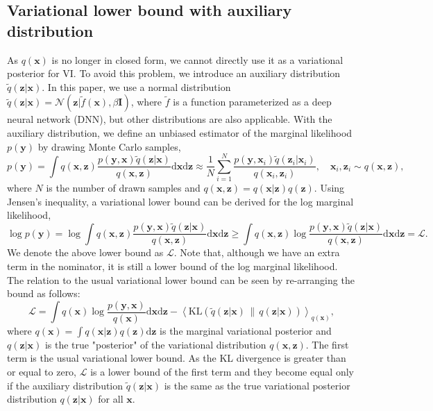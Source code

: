 \documentclass{article}
\newcommand{\yV}{\mathbf{y}}
\newcommand{\xV}{\mathbf{x}}
\newcommand{\zV}{\mathbf{z}}
\newcommand{\bound}{\mathcal{L}}
\newcommand{\I}{\mathbf{I}}
\newcommand{\KL}[2]{\text{KL}\left( #1\,\|\,#2 \right)}
\newcommand{\expectationDist}[2]{\left\langle #1 \right\rangle _{#2}}
\newcommand{\diff}{\text{d}}
\newcommand{\gaussianDist}[3]{\mathcal{N}\left(#1|#2,#3\right)}
\begin{document}
\subsection{Variational lower bound with auxiliary distribution}

As $q(\xV)$ is no longer in closed form, we cannot directly use it as a variational posterior for VI. To avoid this problem, we introduce an auxiliary distribution $\tilde{q}(\zV|\xV)$. In this paper, we use a normal distribution $\tilde{q}(\zV|\xV)= \gaussianDist{\zV}{\tilde{f}(\xV)}{\beta\I}$, where $\tilde{f}$ is a function parameterized as a deep neural network (DNN), but other distributions are also applicable. With the auxiliary distribution, we define an unbiased estimator of the marginal likelihood $p(\yV)$ by drawing Monte Carlo samples,
\begin{equation}
p(\yV) = \int q(\xV, \zV) \frac{p(\yV, \xV) \tilde{q}(\zV | \xV)}{q(\xV, \zV)} \diff \xV \diff \zV \approx \frac{1}{N} \sum_{i=1}^N \frac{p(\yV, \xV_i) \tilde{q}(\zV_i | \xV_i)}{q(\xV_i, \zV_i)}, \quad \xV_i, \zV_i \sim q(\xV, \zV), \label{eqn:importance_sampling}
\end{equation}
where $N$ is the number of drawn samples and $q(\xV, \zV) = q(\xV|\zV) q(\zV)$. Using Jensen's inequality, a variational lower bound can be derived for the log marginal likelihood,
\begin{equation}
\log p(\yV) = \log \int q(\xV, \zV) \frac{p(\yV, \xV) \tilde{q}(\zV | \xV)}{q(\xV, \zV)} \diff \xV \diff \zV \geq  \int q(\xV, \zV) \log \frac{p(\yV, \xV) \tilde{q}(\zV | \xV)}{q(\xV, \zV)} \diff \xV \diff \zV = \bound. \label{eqn:nfw_bound}
\end{equation}
We denote the above lower bound as $\bound$. Note that, although we have an extra term in the nominator, it is still a lower bound of the log marginal likelihood. The relation to the usual variational lower bound can be seen by re-arranging the bound as follows:
\begin{equation}
\bound = \int q(\xV) \log \frac{p(\yV, \xV) }{q(\xV)} \diff \xV \diff \zV - \expectationDist{\KL{\tilde{q}(\zV|\xV)}{q(\zV|\xV)}}{q(\xV)},
\end{equation}
where $q(\xV) = \int q(\xV| \zV) q(\zV) \diff \zV$ is the marginal variational posterior and $q(\zV|\xV)$ is the true "posterior" of the variational distribution $q(\xV, \zV)$. The first term is the usual variational lower bound. As the KL divergence is greater than or equal to zero, $\bound$ is a lower bound of the first term and they become equal only if the auxiliary distribution $\tilde{q}(\zV|\xV)$ is the same as the true variational posterior distribution $q(\zV|\xV)$ for all $\xV$.
\end{document}
